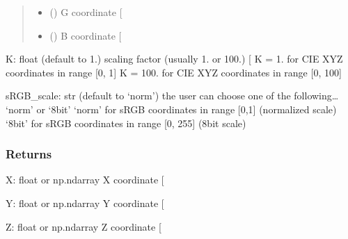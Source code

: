 \documentclass[letterpaper,10pt,english]{sphinxmanual}
\begin{document}
\begin{fulllineitems}
\begin{quote}
\begin{description}
\begin{itemize}
\item {} 
\sphinxAtStartPar
{} () \textendash{} G coordinate {[}\sphinxhyphen{}{]}

\item {} 
\sphinxAtStartPar
{} () \textendash{} B coordinate {[}\sphinxhyphen{}{]}

\end{itemize}

\end{description}\end{quote}

\sphinxAtStartPar
K: float (default to 1.)
scaling factor (usually 1. or 100.) {[}\sphinxhyphen{}{]}
K = 1. for CIE XYZ coordinates in range {[}0, 1{]}
K = 100. for CIE XYZ coordinates in range {[}0, 100{]}

\sphinxAtStartPar
sRGB\_scale: str (default to ‘norm’)
the user can choose one of the following… ‘norm’ or ‘8bit’
‘norm’ for sRGB coordinates in range {[}0,1{]} (normalized scale)
‘8bit’ for sRGB coordinates in range {[}0, 255{]} (8\sphinxhyphen{}bit scale)


\subsubsection{Returns}
\label{\detokenize{07_colors:id19}}
\sphinxAtStartPar
X: float or np.ndarray
X coordinate {[}\sphinxhyphen{}{]}

\sphinxAtStartPar
Y: float or np.ndarray
Y coordinate {[}\sphinxhyphen{}{]}

\sphinxAtStartPar
Z: float or np.ndarray
Z coordinate {[}\sphinxhyphen{}{]}

\end{fulllineitems}

\end{document}
